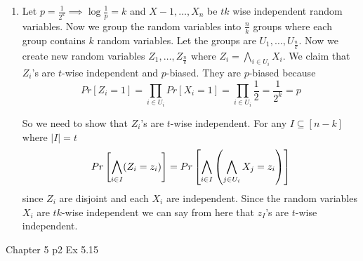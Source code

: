 \documentclass[a4paper, 11pt]{article}
\begin{document}
{\begin{enumerate}
		We have to have $k(\log n-\log\log n+O(1))$ random bits. If we take $m=\log n -\log\log n+O(1)=\log\lt(\frac{n2^{O(1)}}{\log n}\rt)$ then the field size at first becomes $2^m=\frac{n2^{O(1)}}{\log n}$. Then the size of the code becomes $2^{km}=\lt(2^m\rt)^k=\lt(\frac{n2^{O(1)}}{\log n}\rt)^k$ then the number of random bits needed is $$\log \lt(\lt(\frac{n2^{O(1)}}{\log n}\rt)^k\rt)=k(\log n -\log\log n+O(1))$$ Since in the original $MDS$ code $[n',k]_{2^m}$ where $n'=\frac{n}{m}$, $m=\log n -\log\log n+O(1)$ the code $[n'm=n,km=k(\log n -\log\log n+O(1)),d]_2$ is $k$-wise independent code of size $\lt(\frac{n2^{O(1)}}{\log n}\rt)^k$. So if we take 1 in place of $O(1)$ then we have a code of size $\lt(\frac{2n}{\log n}\rt)^k$ which is $k$-wise independent.
		
		
		
		\item Let $p=\frac{1}{2^k}\implies \log \frac1p=k$ and $X-1,\dots, X_n$ be $tk$ wise independent random variables. Now we group the random variables into $\frac{n}{k}$ groups where each group contains $k$ random variables. Let the groups are $U_1,\dots, U_{\frac{n}{k}}$. Now we create new random variables $Z_1,\dots, Z_{\frac{n}{k}}$ where $Z_i=\bigwedge\limits_{i\in U_i}X_i$. We claim that $Z_i$'s are $t$-wise independent and $p$-biased. They are $p$-biased because $$Pr[Z_i=1]=\prod_{i\in U_i}Pr[X_i=1]=\prod_{i\in U_i}\frac12=\frac1{2^k}=p$$\parinn
		
		So we need to show that $Z_i$'s are $t$-wise independent. For any $I\subseteq [n-k]$ where $|I|=t$ $$Pr\left[ \bigwedge_{i\in I}(Z_i=z_i) \right]=Pr\left[ \bigwedge_{i\in I}\left(\bigwedge_{j\in U_i}X_j=z_i\right) \right]$$since $Z_i$ are disjoint and each $X_i$ are independent. Since the random variables $X_i$ are $tk$-wise independent we can say from here that $z_I$'s are $t$-wise independent.
	\end{enumerate}
}



\begin{problem}{%
		Chapter 5
	}{p2%
	}
	Ex 5.15
\end{problem}
\end{document}
